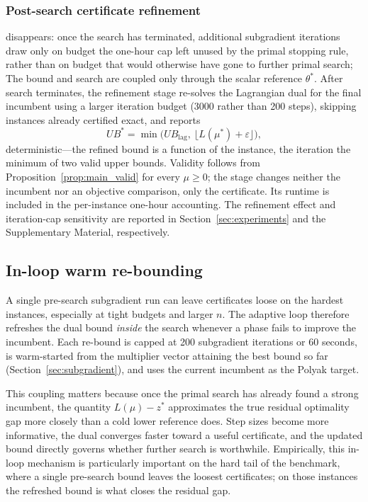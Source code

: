 \documentclass[preprint,12pt]{elsarticle}
\begin{document}
\subsubsection*{Post-search certificate refinement}

disappears: once the search has terminated, additional subgradient iterations
draw only on budget the one-hour cap left unused by the primal stopping rule,
rather than on budget that would otherwise have gone to further primal search;
The bound and search are coupled only through the scalar reference $\theta^*$.
After search terminates, the refinement stage re-solves the Lagrangian dual for
the final incumbent using a larger iteration budget (3000 rather than 200
steps), skipping instances already certified exact, and reports
\[
UB^{\ast} = \min\bigl(UB_{\text{lag}},\ \bigl\lfloor L(\mu^{\ast}) + \varepsilon \bigr\rfloor\bigr),
\]
deterministic---the refined bound is a function of the instance, the iteration
the minimum of two valid upper bounds. Validity follows from
Proposition~\ref{prop:main_valid} for every $\mu\ge0$; the stage changes neither
the incumbent nor an objective comparison, only the certificate. Its runtime is
included in the per-instance one-hour accounting. The refinement effect and
iteration-cap sensitivity are reported in Section~\ref{sec:experiments} and the
Supplementary Material, respectively.

\subsection{In-loop warm re-bounding}

A single pre-search subgradient run can leave certificates loose on the hardest instances, especially at tight budgets and larger $n$. The adaptive loop therefore refreshes the dual bound \emph{inside} the search whenever a phase fails to improve the incumbent. Each re-bound is capped at 200 subgradient iterations or 60 seconds, is warm-started from the multiplier vector attaining the best bound so far (Section~\ref{sec:subgradient}), and uses the current incumbent as the Polyak target.

This coupling matters because once the primal search has already found a strong incumbent, the quantity $L(\mu)-z^*$ approximates the true residual optimality gap more closely than a cold lower reference does. Step sizes become more informative, the dual converges faster toward a useful certificate, and the updated bound directly governs whether further search is worthwhile. Empirically, this in-loop mechanism is particularly important on the hard tail of the benchmark, where a single pre-search bound leaves the loosest certificates; on those instances the refreshed bound is what closes the residual gap.
\end{document}
